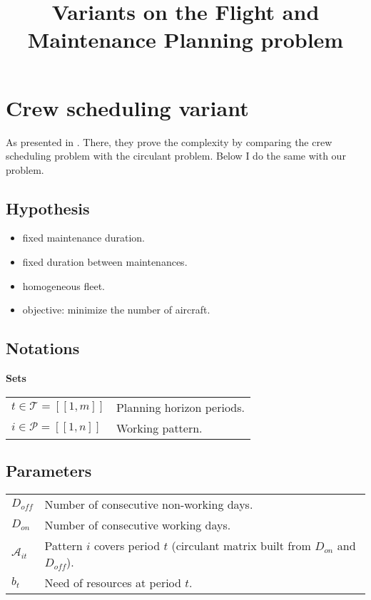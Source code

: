 \documentclass[a4paper,11pt]{article}
\title{Variants on the Flight and Maintenance Planning problem}
\author{}
\begin{document}
\maketitle

\section{Crew scheduling variant}

    As presented in \cite{Brunner2013}. There, they prove the complexity by comparing the crew scheduling problem with the circulant problem. Below I do the same with our problem.

    \subsection{Hypothesis}

    \begin{itemize}
     \item fixed maintenance duration.
     \item fixed duration between maintenances.
     \item homogeneous fleet.
     \item objective: minimize the number of aircraft.
    \end{itemize}

    \subsection{Notations}

    \textbf{Sets}

    \begin{tabular}{ll}
    $t\in \mathcal{T} = [\![1, m]\!]$ & Planning horizon periods. \\
    $i \in \mathcal{P} = [\![1, n]\!]$ & Working pattern.\\
    \end{tabular}

    \vskip 0.3cm

    \subsection{Parameters}

    \begin{tabular}{ll}
        $D_{off}$ & Number of consecutive non-working days. \\
        $D_{on}$ & Number of consecutive working days. \\
        $\mathcal{A}_{it}$ & Pattern $i$ covers period $t$ (circulant matrix built from $D_{on}$ and $D_{off}$).\\
        $b_{t}$ & Need of resources at period $t$. \\
    \end{tabular}
\end{document}

